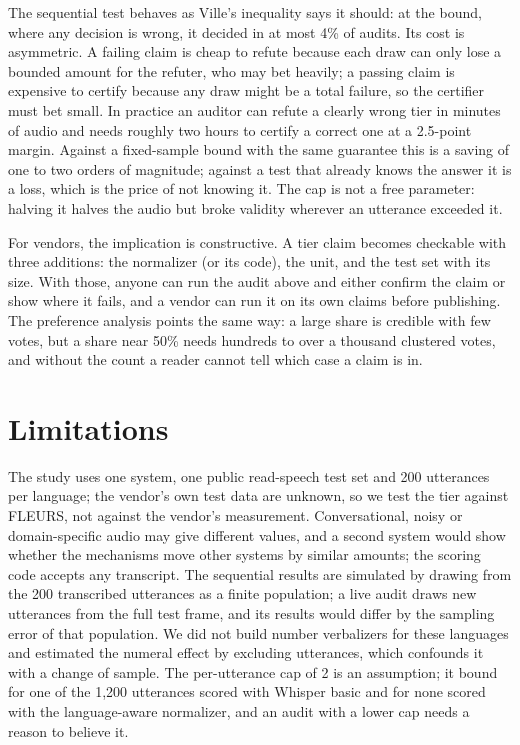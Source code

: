The sequential test behaves as Ville's inequality says it should: at the bound, where any decision is wrong, it decided in at most 4\% of audits. Its cost is asymmetric. A failing claim is cheap to refute because each draw can only lose a bounded amount for the refuter, who may bet heavily; a passing claim is expensive to certify because any draw might be a total failure, so the certifier must bet small. In practice an auditor can refute a clearly wrong tier in minutes of audio and needs roughly two hours to certify a correct one at a 2.5-point margin. Against a fixed-sample bound with the same guarantee this is a saving of one to two orders of magnitude; against a test that already knows the answer it is a loss, which is the price of not knowing it. The cap is not a free parameter: halving it halves the audio but broke validity wherever an utterance exceeded it.

For vendors, the implication is constructive. A tier claim becomes checkable with three additions: the normalizer (or its code), the unit, and the test set with its size. With those, anyone can run the audit above and either confirm the claim or show where it fails, and a vendor can run it on its own claims before publishing. The preference analysis points the same way: a large share is credible with few votes, but a share near 50\% needs hundreds to over a thousand clustered votes, and without the count a reader cannot tell which case a claim is in.

\section{Limitations}
\label{sec:limitations}

The study uses one system, one public read-speech test set and 200 utterances per language; the vendor's own test data are unknown, so we test the tier against FLEURS, not against the vendor's measurement. Conversational, noisy or domain-specific audio may give different values, and a second system would show whether the mechanisms move other systems by similar amounts; the scoring code accepts any transcript. The sequential results are simulated by drawing from the 200 transcribed utterances as a finite population; a live audit draws new utterances from the full test frame, and its results would differ by the sampling error of that population. We did not build number verbalizers for these languages and estimated the numeral effect by excluding utterances, which confounds it with a change of sample. The per-utterance cap of 2 is an assumption; it bound for one of the 1{,}200 utterances scored with Whisper basic and for none scored with the language-aware normalizer, and an audit with a lower cap needs a reason to believe it.

